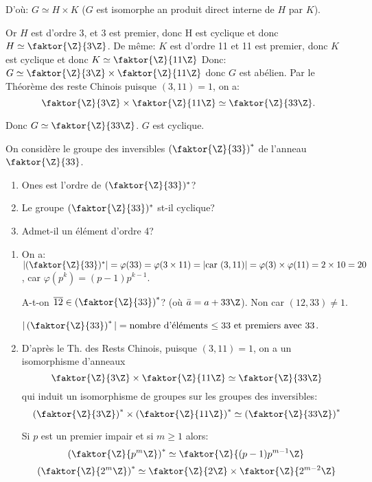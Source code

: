 \begin{examplebox}
\begin{enumerate}
		D'où: $G\simeq H\times K$ ($G$ est isomorphe an produit direct interne de $H$ par $K$).
		
		Or $H$ est d'ordre 3, et 3 est premier, donc H est cyclique et donc $H\simeq \faktor{\Z}{3\Z}$.
		De même: $K$ est d'ordre 11 et 11 est premier, donc $K$ est cyclique et donc $K\simeq \faktor{\Z}{11\Z}$
		Donc: $G\simeq \faktor{\Z}{3\Z}\times \faktor{\Z}{11\Z}$ donc $G$ est abélien. 
		Par le Théorème des reste Chinois puisque $(3,11)=1$, on a:
		$$\faktor{\Z}{3\Z}\times\faktor{\Z}{11\Z}\simeq\faktor{\Z}{33\Z}.$$
		
		Donc $G\simeq \faktor{\Z}{33\Z}$. $G$ est cyclique.
	\end{enumerate}
\end{examplebox}

\begin{examplebox}
	On considère le groupe des inversibles $\left(\faktor{\Z}{33}\right)^{\ast}$ de l'anneau $\faktor{\Z}{33}$.
	\begin{enumerate}
		\item Ones est l'ordre de $(\faktor{\Z}{33})^{\ast}$?
		\item Le groupe $(\faktor{\Z}{33})^{\ast}$ st-il cyclique?
		\item Admet-il un élément d'ordre 4?
	\end{enumerate}
	\begin{enumerate}
		\item On a: $|(\faktor{\Z}{33})^{\ast}|=\varphi(33)=\varphi (3\times 11)=|\text{car $(3,11)$}|=\varphi (3)\times\varphi (11)=2\times 10=20$, car $\varphi(p^k)=(p-1)p^{k-1}$.
		
		
		\begin{remark}
			A-t-on $\overline{12}\in \left(\faktor{\Z}{33}\right)^{\ast}$? (où $\bar{a}=a+33\Z$). Non car $(12, 33)\neq 1$.
			
			$|\left(\faktor{\Z}{33}\right)^{\ast}| = \text{nombre d'éléments $\leq 33$ et premiers avec $33$}$.
		\end{remark}
		
		
		\item D'après le Th. des Rests Chinois, puisque $(3,11)=1$, on a un isomorphisme d'anneaux 
		$$\faktor{\Z}{3\Z}\times\faktor{\Z}{11\Z}\simeq\faktor{\Z}{33\Z}$$
		qui induit un isomorphisme de groupes sur les groupes des inversibles:
		$$\left(\faktor{\Z}{3\Z}\right)^{\ast}\times\left(\faktor{\Z}{11\Z}\right)^{\ast}\simeq\left(\faktor{\Z}{33\Z}\right)^{\ast}$$
		
		
\begin{rappel}
Si $p$ est un premier impair et si $m\geq 1$ alors: 
$$\left(\faktor{\Z}{p^m\Z}\right)^{\ast}\simeq\faktor{\Z}{(p-1)p^{m-1}\Z}$$
$$\left(\faktor{\Z}{2^m\Z}\right)^{\ast}\simeq \faktor{\Z}{2\Z}\times \faktor{\Z}{2^{m-2}\Z}$$
\end{rappel}


\end{enumerate}
\end{examplebox}
